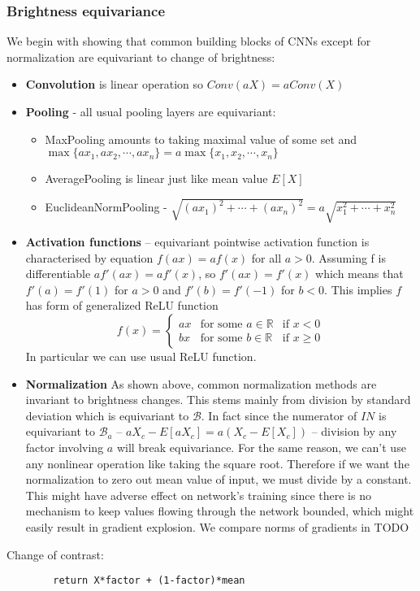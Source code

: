 \subsubsection{Brightness equivariance}
We begin with showing that common building blocks of CNNs except for
normalization are equivariant to change of brightness:
\begin{itemize}
    \item \textbf{Convolution} is linear operation so $\textit{Conv}(aX) =
        a\textit{Conv}(X)$
    \item \textbf{Pooling} - all usual pooling layers are equivariant:
        \begin{itemize}
            \item MaxPooling amounts to taking maximal value of some set and\\
                $\max\{ax_1,ax_2,\cdots,ax_n\}=a\max\{x_1,x_2,\cdots,x_n\}$
            \item AveragePooling is linear just like mean value $E[X]$
            \item EuclideanNormPooling -
                $\sqrt{(ax_1)^2+\cdots+(ax_n)^2} = a\sqrt{x_1^2+\cdots+x_n^2}$
        \end{itemize}
    \item \textbf{Activation functions} -- equivariant pointwise activation
        function is characterised by equation $f(ax) = af(x)$ for all $a>0$.
        Assuming f is differentiable $af'(ax) = af'(x)$, so $f'(ax)=f'(x)$ which
        means that $f'(a)=f'(1)$ for $a>0$ and $f'(b)=f'(-1)$ for $b<0$.
        This implies $f$ has form of generalized ReLU function
        $$f(x)=\left\{
            \begin{array}{lll}
                ax & \mbox{for some } a \in \mathbb{R} & \mbox{if } x<0 \\
                bx & \mbox{for some } b \in \mathbb{R} & \mbox{if } x \geq 0
            \end{array}\right.$$
        In particular we can use usual ReLU function.
    \item \textbf{Normalization} As shown above, common normalization methods are
        invariant to brightness changes. This stems mainly from division by
        standard deviation which is equivariant to $\mathcal{B}$. In fact since
        the numerator of $\textit{IN}$ is equivariant to $\mathcal{B}_a$ --
        $aX_c-E[aX_c]=a(X_c-E[X_c])$ -- division by any factor involving $a$
        will break equivariance. For the same reason, we can't use any
        nonlinear operation like taking the square root.
        Therefore if we want the normalization to zero
        out mean value of input, we must divide by a constant. This might have
        adverse effect on network's training since there is no mechanism to keep
        values flowing through the network bounded, which might easily result in
        gradient explosion. We compare norms of gradients in {\color{red}TODO}
\end{itemize}
    Change of contrast:
    \begin{verbatim}
        return X*factor + (1-factor)*mean
    \end{verbatim}

